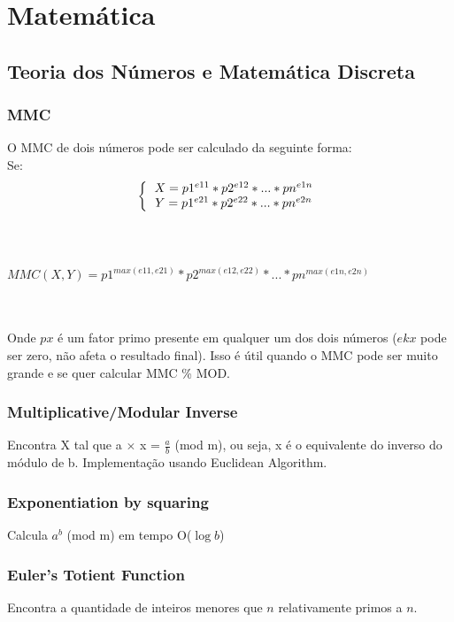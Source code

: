 \section{Matemática}

\subsection{Teoria dos Números e Matemática Discreta}

\subsubsection{MMC}
O MMC de dois n\'{u}meros pode ser calculado da seguinte forma:
\\ Se:
  \[
  \left \{
  \begin{tabular}{c}
    $X=p1^{e11}*p2^{e12}*...*pn^{e1n}$ \\
    $Y=p1^{e21}*p2^{e22}*...*pn^{e2n}$
   \end{tabular}
   \right.
   \]
\\ 
\\ \centerline{$MMC(X,Y)=p1^{max(e11,e21)}*p2^{max(e12,e22)}*...*pn^{max(e1n,e2n)}$}
\\
\\ Onde $px$ \'{e} um fator primo presente em qualquer um dos dois n\'{u}meros ($ekx$ pode ser zero, n\~{a}o afeta o resultado final). Isso \'{e} \'{u}til quando o MMC pode ser muito grande e se quer calcular MMC \% MOD.

\divisor

\subsubsection{Multiplicative/Modular Inverse}
Encontra X tal que a $\times$ x = $\frac{a}{b}$ (mod m), ou seja, x é o equivalente do inverso do módulo de b. Implementação usando Euclidean Algorithm.
\divisor

\subsubsection{Exponentiation by squaring}
Calcula $a^b$ (mod m) em tempo O($\log{b}$)
\divisor

\subsubsection{Euler's Totient Function}
Encontra a quantidade de inteiros menores que $n$ relativamente primos a $n$.
\divisor

